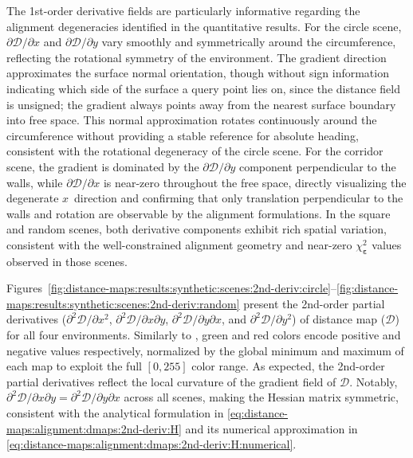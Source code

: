 The 1st-order derivative fields are particularly informative regarding the
alignment degeneracies identified in the quantitative results.
For the circle scene, $\partial\mathcal{D}/\partial x$ and
$\partial\mathcal{D}/\partial y$ vary smoothly and symmetrically around the
circumference, reflecting the rotational symmetry of the environment. The
gradient direction approximates the surface normal orientation, though
without sign information indicating which side of the surface a query point
lies on, since the distance field is unsigned; the gradient always points
away from the nearest surface boundary into free space.
This normal approximation rotates continuously around the circumference
without providing a stable reference for absolute heading, consistent with
the rotational degeneracy of the circle scene.
For the corridor scene, the gradient is dominated by the
$\partial\mathcal{D}/\partial y$ component perpendicular to the walls, while
$\partial\mathcal{D}/\partial x$ is near-zero throughout the free space,
directly visualizing the degenerate $x$~direction and confirming that only
translation perpendicular to the walls and rotation are observable by the
alignment formulations.
In the square and random scenes, both derivative components exhibit rich
spatial variation, consistent with the well-constrained alignment geometry
and near-zero $\chi_{\boldsymbol{\varepsilon}}^2$ values observed in those scenes.

Figures~\ref{fig:distance-maps:results:synthetic:scenes:2nd-deriv:circle}--\ref{fig:distance-maps:results:synthetic:scenes:2nd-deriv:random}
present the 2nd-order partial derivatives
($\partial^2 \mathcal{D} / \partial x^2$,
$\partial^2 \mathcal{D} / \partial x \partial y$,
$\partial^2 \mathcal{D} / \partial y \partial x$, and
$\partial^2 \mathcal{D} / \partial y^2$) of distance map ($\mathcal{D}$) for all
four environments.
Similarly to ,
green and red colors encode positive and negative values respectively,
normalized by the global minimum and maximum of each map to exploit
the full $[0, 255]$ color range.
As expected, the 2nd-order partial derivatives reflect
the local curvature of the gradient field of $\mathcal{D}$.
Notably, $\partial^2\mathcal{D}/\partial x \partial y = \partial^2\mathcal{D}/\partial y \partial x$
across all scenes, making the
Hessian matrix symmetric, consistent with the analytical formulation in
\eqref{eq:distance-maps:alignment:dmaps:2nd-deriv:H} and its numerical
approximation in
\eqref{eq:distance-maps:alignment:dmaps:2nd-deriv:H:numerical}.

